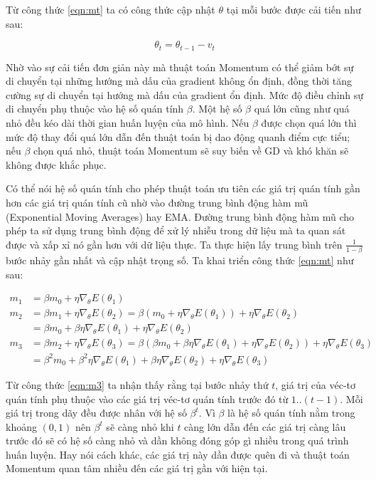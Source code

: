Từ công thức \ref{eqn:mt} ta có công thức cập nhật $\theta$ tại mỗi bước được cải tiến như sau:

\begin{equation}
	\label{eqn:theta-momentum}
	\theta_t = \theta_{t-1} - v_t
\end{equation}

Nhờ vào sự cải tiến đơn giản này mà thuật toán Momentum có thể giảm bớt sự di chuyển tại những hướng mà dấu của gradient không ổn định, đồng thời tăng cường sự di chuyển tại hướng mà dấu của gradient ổn định. Mức độ điều chỉnh sự di chuyển phụ thuộc vào hệ số quán tính $\beta$. Một hệ số $\beta$ quá lớn cũng như quá nhỏ đều kéo dài thời gian huấn luyện của mô hình. Nếu $\beta$ được chọn quá lớn thì mức độ thay đổi quá lớn dẫn đến thuật toán bị dao động quanh điểm cực tiểu; nếu $\beta$ chọn quá nhỏ, thuật toán Momentum sẽ suy biến về GD và khó khăn sẽ không được khắc phục.

Có thể nói hệ số quán tính cho phép thuật toán ưu tiên các giá trị quán tính gần hơn các giá trị quán tính cũ nhờ vào đường trung bình động hàm mũ (Exponential Moving Averages) hay EMA. Đường trung bình động hàm mũ cho phép ta sử dụng trung bình động để xử lý nhiễu trong dữ liệu mà ta quan sát được và xấp xỉ nó gần hơn với dữ liệu thực. Ta thực hiện lấy trung bình trên $\frac{1}{1-\beta}$ bước nhảy gần nhất và cập nhật trọng số. Ta khai triển công thức \ref{eqn:mt} như sau:

\begin{equation}
	\label{eqn:m3}
	\begin{aligned}
		m_1 &= \beta m_0 + \eta\nabla_\theta E(\theta_1) \\ m_2 &= \beta m_1 + \eta \nabla_\theta E(\theta_2) = \beta (m_0 + \eta\nabla_\theta E(\theta_1)) + \eta\nabla_\theta E(\theta_2) \\ &= \beta m_0 + \beta\eta\nabla_\theta E(\theta_1) + \eta\nabla_\theta E(\theta_2) \\ m_3 &= \beta m_2 + \eta\nabla_\theta E(\theta_3) = \beta (\beta m_0 + \beta\eta\nabla_\theta E(\theta_1) + \eta\nabla_\theta E(\theta_2)) + \eta\nabla_\theta E(\theta_3) \\ &= \beta^2 m_0 + \beta^2\eta \nabla_\theta E(\theta_1) + \beta \eta \nabla_\theta E(\theta_2) +\eta \nabla_\theta E(\theta_3)
	\end{aligned}
\end{equation}

Từ công thức \ref{eqn:m3} ta nhận thấy rằng tại bước nhảy thứ $t$, giá trị của véc-tơ quán tính phụ thuộc vào các giá trị véc-tơ quán tính trước đó từ $1..(t-1)$. Mỗi giá trị trong dãy đều được nhân với hệ số $\beta ^t$. Vì $\beta$ là hệ số quán tính nằm trong khoảng $(0,1)$ nên $\beta^t$ sẽ càng nhỏ khi $t$ càng lớn dẫn đến các giá trị càng lâu trước đó sẽ có hệ số càng nhỏ và dần không đóng góp gì nhiều trong quá trình huấn luyện. Hay nói cách khác, các giá trị này dần được quên đi và thuật toán Momentum quan tâm nhiều đến các giá trị gần với hiện tại.

